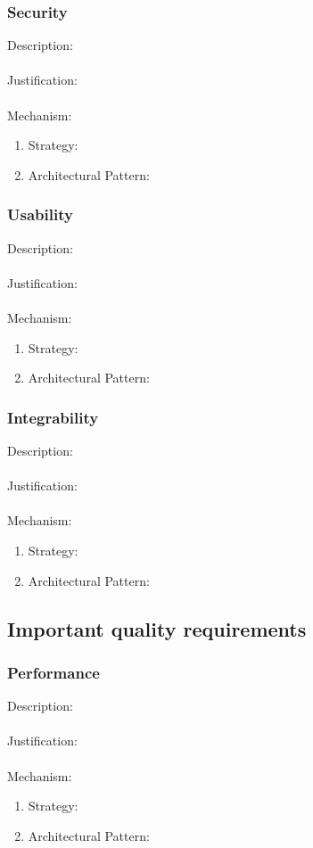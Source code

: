 \documentclass[a4paper,12pt,titlepage]{article}
\begin{document}
\subsubsection{Security}%
	Description: \\\\
	Justification: \\\\
	Mechanism:
	\begin{enumerate}
		\item Strategy: 
		\item Architectural Pattern:
	\end{enumerate}
\subsubsection{Usability}%
	Description: \\\\
	Justification: \\\\
	Mechanism:
	\begin{enumerate}
		\item Strategy: 
		\item Architectural Pattern:
	\end{enumerate}
\subsubsection{Integrability}%
	Description: \\\\
	Justification: \\\\
	Mechanism:
	\begin{enumerate}
		\item Strategy: 
		\item Architectural Pattern:
	\end{enumerate}
\newpage
\subsection{Important quality requirements}
\subsubsection{Performance}%
	Description: \\\\
	Justification: \\\\
	Mechanism:
	\begin{enumerate}
		\item Strategy: 
		\item Architectural Pattern:
	\end{enumerate}
	\newpage
\end{document}
